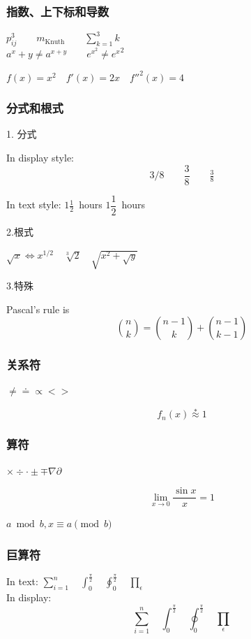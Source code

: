 \documentclass[12pt,UTF8]{ctexart}%
\begin{document}
\subsubsection{指数、上下标和导数}

$p^3_{ij} \qquad
m_\mathrm{Knuth}\qquad
\sum_{k=1}^3 k $\\[5pt]
$a^x+y \neq a^{x+y}\qquad
e^{x^2} \neq {e^x}^2$\par

$f(x) = x^2 \quad f'(x)
= 2x \quad f''^{2}(x) = 4$

\subsubsection{分式和根式}

1. 分式\par

In display style:
\[
3/8 \qquad \frac{3}{8}
\qquad \tfrac{3}{8}
\]

In text style:
$1\frac{1}{2}$~hours \qquad
$1\dfrac{1}{2}$~hours

2.根式\par

$\sqrt{x} \Leftrightarrow x^{1/2}
\quad \sqrt[3]{2}
\quad \sqrt{x^{2} + \sqrt{y}}$

3.特殊\par
Pascal's rule is
\[
\binom{n}{k} =\binom{n-1}{k}
+ \binom{n-1}{k-1}
\]


\subsubsection{关系符}

$\neq\doteq\propto<>$

\[
f_n(x) \stackrel{*}{\approx} 1
\]

\subsubsection{算符}
$\times \div \cdot \pm \mp \nabla \partial$

\[
\lim_{x \rightarrow 0}
\frac{\sin x}{x}=1
\]

$a\bmod b, x\equiv a \pmod{b}$

\subsubsection{巨算符}

In text:
$\sum_{i=1}^n \quad
\int_0^{\frac{\pi}{2}} \quad
\oint_0^{\frac{\pi}{2}} \quad
\prod_\epsilon $ \\
In display:
\[\sum_{i=1}^n \quad
\int_0^{\frac{\pi}{2}} \quad
\oint_0^{\frac{\pi}{2}} \quad
\prod_\epsilon \]
\end{document}
